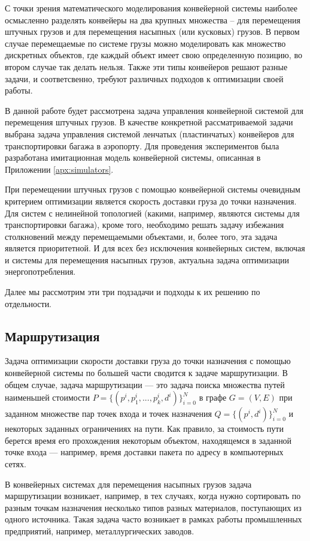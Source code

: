 \documentclass[specification,annotation,times]{itmo-student-thesis}
\theoremstyle{definition}
\begin{document}
С точки зрения математического моделирования конвейерной системы наиболее
осмысленно разделять конвейеры на два крупных множества -- для
перемещения штучных грузов и для перемещения насыпных (или кусковых) грузов.
В первом случае перемещаемые по системе грузы можно моделировать как множество
дискретных объектов, где каждый объект имеет свою определенную позицию, во
втором случае так делать нельзя. Также эти типы конвейеров решают разные задачи,
и соответсвенно, требуют различных подходов к оптимизации своей работы.

В данной работе будет рассмотрена задача управления конвейерной системой для
перемещения штучных грузов. В качестве конкретной рассматриваемой задачи выбрана
задача управления системой ленчатых (пластинчатых) конвейеров для
транспортировки багажа в аэропорту. Для проведения экспериментов 
была разработана имитационная модель конвейерной системы, описанная в Приложении
\ref{apx:simulators}.

При перемещении штучных грузов с помощью конвейерной системы очевидным критерием
оптимизации является скорость доставки груза до точки назначения. Для систем с
нелинейной топологией (какими, например, являются системы для транспортировки
багажа), кроме того, необходимо решать задачу избежания столкновений между
перемещаемыми объектами, и, более того, эта задача является приоритетной.
И для всех без исключения конвейерных систем, включая и системы для перемещения
насыпных грузов, актуальна задача оптимизации энергопотребления.

Далее мы рассмотрим эти три подзадачи и подходы к их решению по отдельности.

\subsection{Маршрутизация}

Задача оптимизации скорости доставки груза до точки назначения с помощью
конвейерной системы по большей части сводится к задаче маршрутизации. В общем
случае, задача маршрутизации --- это задача поиска множества путей наименьшей
стоимости $P = \{(p^i, p_1^i, ... , p_k^i, d^i)\}_{i=0}^N$ в графе $G = (V, E)$ при
заданном множестве пар точек входа и точек назначения
$Q = \{(p^i, d^i)\}_{i=0}^N$ и некоторых заданных ограничениях на пути. Как
правило, за стоимость пути берется время его прохождения некоторым объектом,
находящемся в заданной точке входа --- например, время доставки пакета по адресу
в компьютерных сетях.

В конвейерных системах для перемещения насыпных грузов задача маршрутизации
возникает, например, в тех случаях, когда нужно сортировать по разным точкам
назначения несколько типов разных материалов, поступающих из одного источника.
Такая задача часто возникает в рамках работы промышленных предприятий, например,
металлургических заводов.
\end{document}
